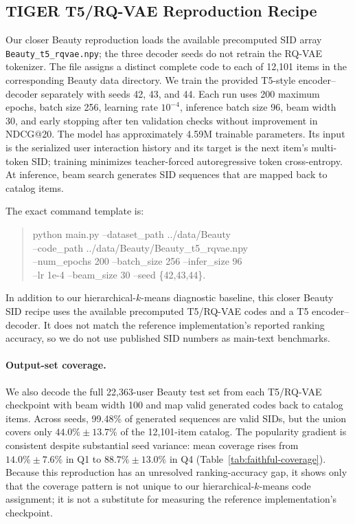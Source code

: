 \documentclass[letterpaper]{article}
\begin{document}
\subsection{TIGER T5/RQ-VAE Reproduction Recipe}
\label{app:tiger_recipe}

Our closer Beauty reproduction loads the available precomputed SID array
\texttt{Beauty\_t5\_rqvae.npy}; the three decoder seeds do not retrain the
RQ-VAE tokenizer. The file assigns a distinct complete code to each of 12,101
items in the corresponding Beauty data directory. We train the provided
T5-style encoder--decoder separately with seeds 42, 43, and 44. Each run uses
200 maximum epochs, batch size 256, learning rate $10^{-4}$, inference batch
size 96, beam width 30, and early stopping after ten validation checks without
improvement in NDCG@20. The model has approximately 4.59M trainable
parameters. Its input is the serialized user interaction history and its
target is the next item's multi-token SID; training minimizes teacher-forced
autoregressive token cross-entropy. At inference, beam search generates SID
sequences that are mapped back to catalog items.

The exact command template is:
\begin{quote}
\small\ttfamily
python main.py --dataset\_path ../data/Beauty\\
--code\_path ../data/Beauty/Beauty\_t5\_rqvae.npy\\
--num\_epochs 200 --batch\_size 256 --infer\_size 96\\
--lr 1e-4 --beam\_size 30 --seed \{42,43,44\}.
\end{quote}

In addition to our hierarchical-$k$-means diagnostic baseline, this closer
Beauty SID recipe uses the available precomputed T5/RQ-VAE codes and a T5
encoder--decoder. It does not match the reference implementation's reported
ranking accuracy, so we do not use published SID numbers as main-text
benchmarks.

\paragraph{Output-set coverage.}
We also decode the full 22,363-user Beauty test set from each T5/RQ-VAE
checkpoint with beam width 100 and map valid generated codes back to catalog
items. Across seeds, 99.48\% of generated sequences are valid SIDs, but the
union covers only $44.0\%\pm13.7\%$ of the 12,101-item catalog. The popularity
gradient is consistent despite substantial seed variance: mean coverage rises
from $14.0\%\pm7.6\%$ in Q1 to $88.7\%\pm13.0\%$ in Q4
(Table~\ref{tab:faithful-coverage}). Because this reproduction has an
unresolved ranking-accuracy gap, it shows only that the coverage pattern is
not unique to our hierarchical-$k$-means code assignment; it is not a
substitute for measuring the reference implementation's checkpoint.
\end{document}
